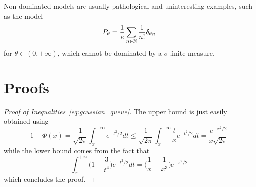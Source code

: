 %
Non-dominated models are usually pathological and uninteresting examples, such as the model
\begin{equation*}
	P_\theta = \frac 1e \sum_{n \in \mathbb N} \frac{1}{n!} \delta_{\theta n}
\end{equation*}
for $\theta \in (0, +\infty)$, which cannot be dominated by a $\sigma$-finite measure.


\section{Proofs} %
\label{sec:chap02-proofs}

\begin{proof}[Proof of Inequalities~\eqref{eq:gaussian_queue}]
	The upper bound is just easily obtained using
\begin{equation*}
	1 - \Phi(x) = \frac{1}{\sqrt{2 \pi}} \int_{x}^{+\infty} e^{-t^2 / 2} dt \leq \frac{1}{\sqrt{2 \pi}} \int_{x}^{+\infty} \frac{t}{x} e^{-t^2 / 2} dt = \frac{e^{-x^2 / 2}}{x \sqrt{2 \pi}} 
\end{equation*}
while the lower bound comes from the fact that
\begin{equation*}
	\int_{x}^{+\infty} \Big(1 - \frac{3}{t^4} \Big) e^{-t^2 / 2} dt = \Big( \frac{1}{x} - \frac{1}{x^3} \Big) e^{-x^2 / 2}
\end{equation*}
which concludes the proof.
\end{proof}
